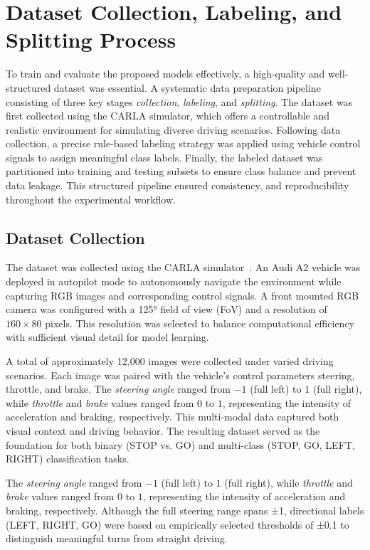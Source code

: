 \section{Dataset Collection, Labeling, and Splitting Process}

To train and evaluate the proposed models effectively, a high-quality and well-structured dataset was essential. A systematic data preparation pipeline consisting of three key stages \textit{collection}, \textit{labeling}, and \textit{splitting}. The dataset was first collected using the CARLA simulator, which offers a controllable and realistic environment for simulating diverse driving scenarios. Following data collection, a precise rule-based labeling strategy was applied using vehicle control signals to assign meaningful class labels. Finally, the labeled dataset was partitioned into training and testing subsets to ensure class balance and prevent data leakage. This structured pipeline ensured consistency, and reproducibility  throughout the experimental workflow.

\subsection{Dataset Collection}

The dataset was collected using the CARLA simulator~\cite{CARLA2024docs}. An Audi A2 vehicle was deployed in autopilot mode to autonomously navigate the environment while capturing RGB images and corresponding control signals. A front mounted RGB camera was configured with a 125° field of view (FoV) and a resolution of $160 \times 80$ pixels. This resolution was selected to balance computational efficiency with sufficient visual detail for model learning.

A total of approximately 12,000 images were collected under varied driving scenarios. Each image was paired with the vehicle’s control parameters steering, throttle, and brake. The \textit{steering angle} ranged from $-1$ (full left) to $1$ (full right), while \textit{throttle} and \textit{brake} values ranged from $0$ to $1$, representing the intensity of acceleration and braking, respectively. This multi-modal data captured both visual context and driving behavior. The resulting dataset served as the foundation for both binary (STOP vs. GO) and multi-class (STOP, GO, LEFT, RIGHT) classification tasks.

The \textit{steering angle} ranged from $-1$ (full left) to $1$ (full right), while \textit{throttle} and \textit{brake} values ranged from $0$ to $1$, representing the intensity of acceleration and braking, respectively. Although the full steering range spans ±1, directional labels (LEFT, RIGHT, GO) were based on empirically selected thresholds of ±0.1 to distinguish meaningful turns from straight driving.

